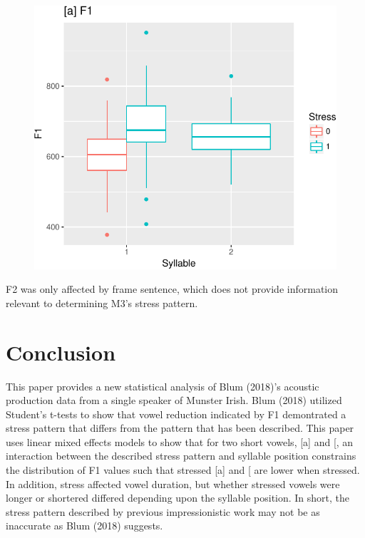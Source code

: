 \documentclass[floatsintext,man]{apa6}
\theoremstyle{definition}
\theoremstyle{definition}
\theoremstyle{definition}
\theoremstyle{remark}
\begin{document}
\begin{figure}
\centering
\includegraphics{mistress_restat_files/figure-latex/af1plot-1.pdf}
\caption{}
\end{figure}

F2 was only affected by frame sentence, which does not provide
information relevant to determining M3's stress pattern.

\section{Conclusion}\label{conclusion}

This paper provides a new statistical analysis of Blum (2018)'s acoustic
production data from a single speaker of Munster Irish. Blum (2018)
utilized Student's t-tests to show that vowel reduction indicated by F1
demontrated a stress pattern that differs from the pattern that has been
described. This paper uses linear mixed effects models to show that for
two short vowels, {[}a{]} and {[}\textipa{@}{]}, an interaction between
the described stress pattern and syllable position constrains the
distribution of F1 values such that stressed {[}a{]} and
{[}\textipa{@}{]} are lower when stressed. In addition, stress affected
vowel duration, but whether stressed vowels were longer or shortered
differed depending upon the syllable position. In short, the stress
pattern described by previous impressionistic work may not be as
inaccurate as Blum (2018) suggests.
\end{document}
